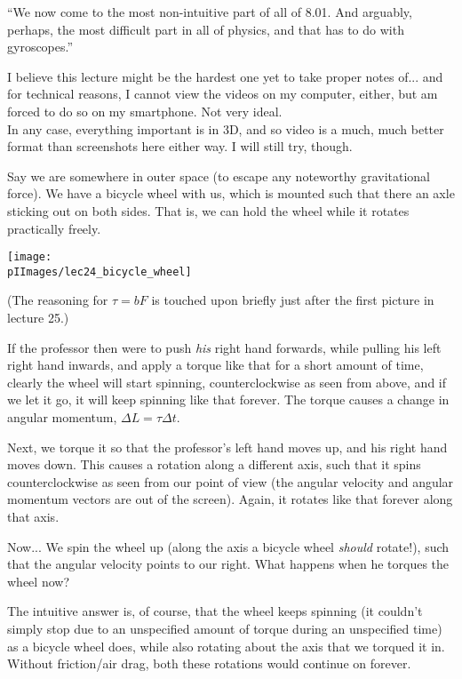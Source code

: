 ``We now come to the most non-intuitive part of all of 8.01. And arguably, perhaps, the most difficult part in all of physics, and that has to do with gyroscopes.''

I believe this lecture might be the hardest one yet to take proper notes of... and for technical reasons, I cannot view the videos on my computer, either, but am forced to do so on my smartphone. Not very ideal.\\
In any case, everything important is in 3D, and so video is a much, much better format than screenshots here either way. I will still try, though.

Say we are somewhere in outer space (to escape any noteworthy gravitational force). We have a bicycle wheel with us, which is mounted such that there an axle sticking out on both sides. That is, we can hold the wheel while it rotates practically freely.

\begin{center}
\texttt{[image: \\pIImages/lec24\_bicycle\_wheel]}
\end{center}

(The reasoning for $\tau = b F$ is touched upon briefly just after the first picture in lecture 25.)

If the professor then were to push \emph{his} right hand forwards, while pulling his left right hand inwards, and apply a torque like that for a short amount of time, clearly the wheel will start spinning, counterclockwise as seen from above, and if we let it go, it will keep spinning like that forever. The torque causes a change in angular momentum, $\Delta L = \tau \Delta t$.

Next, we torque it so that the professor's left hand moves up, and his right hand moves down. This causes a rotation along a different axis, such that it spins counterclockwise as seen from our point of view (the angular velocity and angular momentum vectors are out of the screen). Again, it rotates like that forever along that axis.

Now... We spin the wheel up (along the axis a bicycle wheel \emph{should} rotate!), such that the angular velocity points to our right. What happens when he torques the wheel now?

The intuitive answer is, of course, that the wheel keeps spinning (it couldn't simply stop due to an unspecified amount of torque during an unspecified time) as a bicycle wheel does, while also rotating about the axis that we torqued it in. Without friction/air drag, both these rotations would continue on forever.

